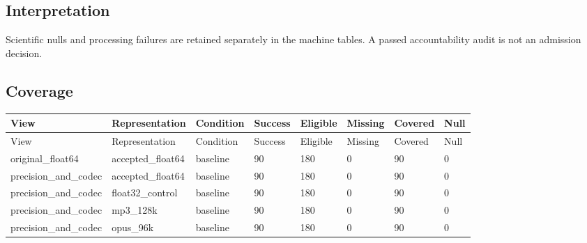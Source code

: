 \documentclass{article}
\begin{document}
\subsection*{Interpretation}
Scientific nulls and processing failures are retained separately in the machine tables. A passed accountability audit is not an admission decision.
\begin{landscape}
\small
\subsection*{Coverage}
\begin{longtable}{L{3.0cm}L{3.2cm}L{2.2cm}R{1.6cm}R{1.6cm}R{1.6cm}R{1.6cm}R{1.6cm}}
View & Representation & Condition & Success & Eligible & Missing & Covered & Null\\\hline
\endfirsthead
View & Representation & Condition & Success & Eligible & Missing & Covered & Null\\\hline
\endhead
original\_\allowbreak{}float64 & accepted\_\allowbreak{}float64 & baseline & 90 & 180 & 0 & 90 & 0\\
precision\_\allowbreak{}and\_\allowbreak{}codec & accepted\_\allowbreak{}float64 & baseline & 90 & 180 & 0 & 90 & 0\\
precision\_\allowbreak{}and\_\allowbreak{}codec & float32\_\allowbreak{}control & baseline & 90 & 180 & 0 & 90 & 0\\
precision\_\allowbreak{}and\_\allowbreak{}codec & mp3\_\allowbreak{}128k & baseline & 90 & 180 & 0 & 90 & 0\\
precision\_\allowbreak{}and\_\allowbreak{}codec & opus\_\allowbreak{}96k & baseline & 90 & 180 & 0 & 90 & 0\\
\end{longtable}

\end{landscape}
\end{document}

